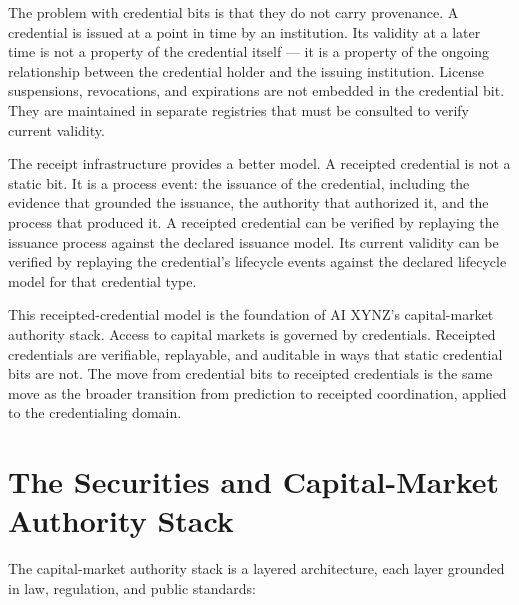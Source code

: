 The problem with credential bits is that they do not carry provenance. A credential is issued at a point in time by an institution. Its validity at a later time is not a property of the credential itself --- it is a property of the ongoing relationship between the credential holder and the issuing institution. License suspensions, revocations, and expirations are not embedded in the credential bit. They are maintained in separate registries that must be consulted to verify current validity.

The receipt infrastructure provides a better model. A receipted credential is not a static bit. It is a process event: the issuance of the credential, including the evidence that grounded the issuance, the authority that authorized it, and the process that produced it. A receipted credential can be verified by replaying the issuance process against the declared issuance model. Its current validity can be verified by replaying the credential's lifecycle events against the declared lifecycle model for that credential type.

This receipted-credential model is the foundation of AI XYNZ's capital-market authority stack. Access to capital markets is governed by credentials. Receipted credentials are verifiable, replayable, and auditable in ways that static credential bits are not. The move from credential bits to receipted credentials is the same move as the broader transition from prediction to receipted coordination, applied to the credentialing domain.

\section{The Securities and Capital-Market Authority Stack}

The capital-market authority stack is a layered architecture, each layer grounded in law, regulation, and public standards:

